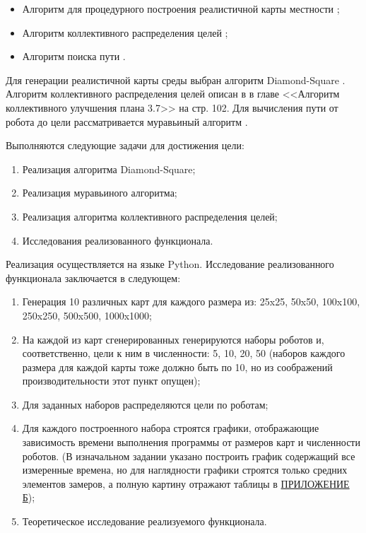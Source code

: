 \documentclass{article}
\begin{document}
    \begin{itemize}
        \item Алгоритм для процедурного построения реалистичной карты местности \cite{terrain};
        \item Алгоритм коллективного распределения целей \cite{plan};
        \item Алгоритм поиска пути \cite{path}.
	\end{itemize}

	Для генерации реалистичной карты среды выбран алгоритм Diamond-Square \cite{DS}. Алгоритм коллективного распределения целей описан в \cite{plan} в главе <<Алгоритм коллективного улучшения плана 3.7>> на стр. 102. Для вычисления пути от робота до цели рассматривается муравьиный алгоритм \cite{ant}.

	Выполняются следующие задачи для достижения цели:
	\begin{enumerate}
		\item Реализация алгоритма Diamond-Square;
		\item Реализация муравьиного алгоритма;
		\item Реализация алгоритма коллективного распределения целей;
		\item Исследования реализованного функционала.
	\end{enumerate}

	Реализация осуществляется на языке Python. Исследование реализованного функционала заключается в следующем:

	\begin{enumerate}
		\item Генерация 10 различных карт для каждого размера из: 25x25, 50x50, 100x100, 250x250, 500x500, 1000x1000;
		\item На каждой из карт сгенерированных генерируются наборы роботов и, соответственно, цели к ним в численности: 5, 10, 20, 50 (наборов каждого размера для каждой карты тоже должно быть по 10, но из соображений производительности этот пункт опущен);
		\item Для заданных наборов распределяются цели по роботам;
		\item Для каждого построенного набора строятся графики, отображающие зависимость времени выполнения программы от размеров карт и численности роботов. (В изначальном задании указано построить график содержащий все измеренные времена, но для наглядности графики строятся только средних элементов замеров, а полную картину отражают таблицы в \hyperref[sec:time]{ПРИЛОЖЕНИЕ Б});
		\item Теоретическое исследование реализуемого функционала.
	\end{enumerate}
\end{document}
